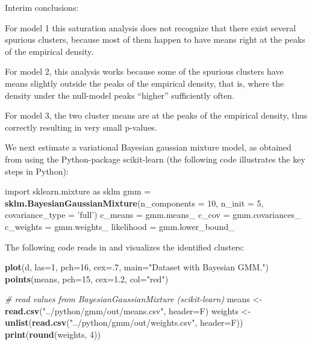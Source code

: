 \documentclass[]{article}
\newenvironment{Shaded}{\begin{snugshade}}{\end{snugshade}}
\newcommand{\CommentTok}[1]{\textcolor[rgb]{0.56,0.35,0.01}{\textit{#1}}}
\newcommand{\DataTypeTok}[1]{\textcolor[rgb]{0.13,0.29,0.53}{#1}}
\newcommand{\DecValTok}[1]{\textcolor[rgb]{0.00,0.00,0.81}{#1}}
\newcommand{\FloatTok}[1]{\textcolor[rgb]{0.00,0.00,0.81}{#1}}
\newcommand{\KeywordTok}[1]{\textcolor[rgb]{0.13,0.29,0.53}{\textbf{#1}}}
\newcommand{\NormalTok}[1]{#1}
\newcommand{\StringTok}[1]{\textcolor[rgb]{0.31,0.60,0.02}{#1}}
\begin{document}
Interim conclusions:

For model 1 this saturation analysis does not recognize that there exist
several spurious clusters, because most of them happen to have means
right at the peaks of the empirical density.

For model 2, this analysis works because some of the spurious clusters
have means slightly outside the peaks of the empirical density, that is,
where the density under the null-model peaks ``higher'' sufficiently
often.

For model 3, the two cluster means are at the peaks of the empirical
density, thus correctly resulting in very small p-values.

We next estimate a variational Bayesian gaussian mixture model, as
obtained from using the Python-package scikit-learn (the following code
illustrates the key steps in Python):

\begin{Shaded}
\begin{Highlighting}[]
\NormalTok{  import sklearn.mixture as sklm}
\NormalTok{  gmm =}\StringTok{ }\KeywordTok{sklm.BayesianGaussianMixture}\NormalTok{(}\DataTypeTok{n_components =} \DecValTok{10}\NormalTok{,}
                                     \DataTypeTok{n_init =} \DecValTok{5}\NormalTok{,}
                                     \DataTypeTok{covariance_type =} \StringTok{'full'}\NormalTok{)}
\NormalTok{  c_means =}\StringTok{ }\NormalTok{gmm.means_}
\NormalTok{  c_cov =}\StringTok{ }\NormalTok{gmm.covariances_}
\NormalTok{  c_weights =}\StringTok{ }\NormalTok{gmm.weights_}
\NormalTok{  likelihood =}\StringTok{ }\NormalTok{gmm.lower_bound_}
\end{Highlighting}
\end{Shaded}

The following code reads in and visualizes the identified clusters:

\begin{Shaded}
\begin{Highlighting}[]
\KeywordTok{plot}\NormalTok{(d, }\DataTypeTok{las=}\DecValTok{1}\NormalTok{, }\DataTypeTok{pch=}\DecValTok{16}\NormalTok{, }\DataTypeTok{cex=}\NormalTok{.}\DecValTok{7}\NormalTok{, }\DataTypeTok{main=}\StringTok{"Dataset with Bayesian GMM."}\NormalTok{)}
\KeywordTok{points}\NormalTok{(means, }\DataTypeTok{pch=}\DecValTok{15}\NormalTok{, }\DataTypeTok{cex=}\FloatTok{1.2}\NormalTok{, }\DataTypeTok{col=}\StringTok{"red"}\NormalTok{)}

\CommentTok{# read values from BayesianGaussianMixture (scikit-learn)}
\NormalTok{means <-}\StringTok{ }\KeywordTok{read.csv}\NormalTok{(}\StringTok{"../python/gmm/out/means.csv"}\NormalTok{, }\DataTypeTok{header=}\NormalTok{F)}
\NormalTok{weights <-}\StringTok{ }\KeywordTok{unlist}\NormalTok{(}\KeywordTok{read.csv}\NormalTok{(}\StringTok{"../python/gmm/out/weights.csv"}\NormalTok{, }\DataTypeTok{header=}\NormalTok{F))}
\KeywordTok{print}\NormalTok{(}\KeywordTok{round}\NormalTok{(weights, }\DecValTok{4}\NormalTok{))}
\end{Highlighting}
\end{Shaded}
\end{document}
